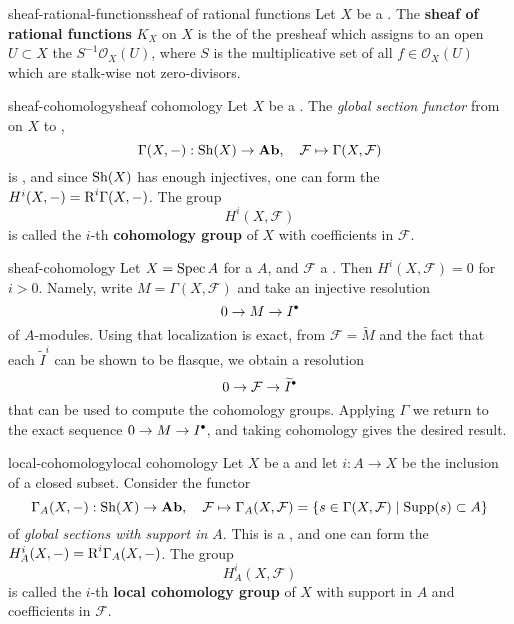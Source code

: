 \begin{topic}{sheaf-rational-functions}{sheaf of rational functions}
    Let $X$ be a . The \textbf{sheaf of rational functions} $K_X$ on $X$ is the  of the presheaf which assigns to an open $U \subset X$ the  $S^{-1} \mathcal{O}_X(U)$, where $S$ is the multiplicative set of all $f \in \mathcal{O}_X(U)$ which are stalk-wise not zero-divisors.
\end{topic}

\begin{topic}{sheaf-cohomology}{sheaf cohomology}
    Let $X$ be a . The \textit{global section functor} from  on $X$ to ,
    \[ \Gamma(X, -) : \textup{Sh}(X) \to \textbf{Ab} , \quad \mathcal{F} \mapsto \Gamma(X, \mathcal{F}) \]
    is , and since $\textup{Sh}(X)$ has enough injectives, one can form the  $H^i(X, -) = \textup{R}^i \Gamma(X, -)$. The group
    \[ H^i(X, \mathcal{F}) \]
    is called the $i$-th \textbf{cohomology group} of $X$ with coefficients in $\mathcal{F}$.
\end{topic}

\begin{example}{sheaf-cohomology}
    Let $X = \operatorname{Spec} A$ for a  $A$, and $\mathcal{F}$ a . Then $H^i(X, \mathcal{F}) = 0$ for $i > 0$. Namely, write $M = \Gamma(X, \mathcal{F})$ and take an injective resolution
    \[ 0 \to M \to I^\bdot \]
    of $A$-modules. Using that localization is exact, from $\mathcal{F} = \widetilde{M}$ and the fact that each $\widetilde{I}^i$ can be shown to be flasque, we obtain a resolution
    \[ 0 \to \mathcal{F} \to \widetilde{I}^\bdot \]
    that can be used to compute the cohomology groups. Applying $\Gamma$ we return to the exact sequence $0 \to M \to I^\bdot$, and taking cohomology gives the desired result.
\end{example}

\begin{topic}{local-cohomology}{local cohomology}
    Let $X$ be a  and let $i : A \to X$ be the inclusion of a closed subset. Consider the functor
    \[ \Gamma_A(X, -) : \textup{Sh}(X) \to \textbf{Ab}, \quad \mathcal{F} \mapsto \Gamma_A(X, \mathcal{F}) = \{ s \in \Gamma(X, \mathcal{F}) \;|\;\textup{Supp}(s) \subset A \} \]
    of \textit{global sections with support in $A$}. This is a , and one can form the  $H_A^i(X, -) = \textup{R}^i \Gamma_A(X, -)$. The group
    \[ H_A^i(X, \mathcal{F}) \]
    is called the $i$-th \textbf{local cohomology group} of $X$ with support in $A$ and coefficients in $\mathcal{F}$.
\end{topic}

